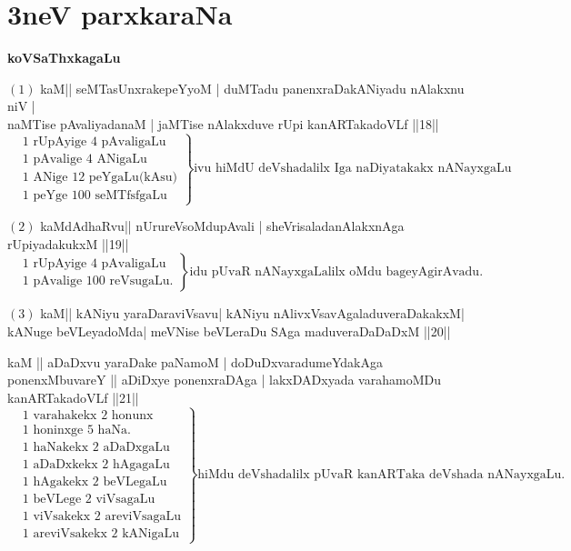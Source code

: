 \chapter{3neV parxkaraNa}

\centerline{{\huge\bf koVSaThxkagaLu}}
\smallskip

$(1)$ kaM|| seMTasUnxrakepeYyoM | duMTadu panenxraDakANiyadu nAlakxnu niV |\\
naMTise pAvaliyadanaM | jaMTise nAlakxduve rUpi kanARTakadoVLf ||18||
\begin{equation*}
\left.
\begin{aligned}
 &\text{$1$ rUpAyige $4$ pAvaligaLu}\\
 &\text{$1$ pAvalige $4$ ANigaLu}\\
 &\text{$1$ ANige $12$ peYgaLu(kAsu)}\\
 &\text{$1$ peYge $100$ seMTfsfgaLu}
\end{aligned}
\right\}
\text{ivu hiMdU deVshadalilx Iga 
naDiyatakakx nANayxgaLu}
\end{equation*}

$(2)$ kaMdAdhaRvu|| nUrureVsoMdupAvali | sheVrisaladanAlakxnAga rUpiyadakukxM ||19||
\begin{equation*}
\left.
\begin{aligned}
&\text{$1$ rUpAyige $4$ pAvaligaLu}\\
&\text{$1$ pAvalige $100$ reVsugaLu.}
\end{aligned}
\right\}
\text {idu pUvaR nANayxgaLalilx oMdu bageyAgirAvadu.}
\end{equation*}

$(3)$ kaM|| kANiyu yaraDaraviVsavu| kANiyu nAlivxVsavAgaladuveraDakakxM| kANuge beVLeyadoMda| meVNise beVLeraDu SAga maduveraDaDaDxM ||20||

kaM || aDaDxvu yaraDake paNamoM | doDuDxvaradumeYdakAga ponenxMbuvareY || aDiDxye ponenxraDAga | lakxDADxyada varahamoMDu kanARTakadoVLf ||21||
\begin{equation*}
\left.
\begin{aligned}
&\text{$1$ varahakekx $2$ honunx }\\
&\text{$1$ honinxge $5$ haNa.}\\
&\text{$1$ haNakekx  $2$ aDaDxgaLu}\\
&\text{$1$ aDaDxkekx $2$ hAgagaLu}\\
&\text{$1$ hAgakekx $2$ beVLegaLu}\\
&\text{$1$ beVLege $2$ viVsagaLu}\\
&\text{$1$ viVsakekx $2$ areviVsagaLu}\\
&\text{$1$ areviVsakekx $2$ kANigaLu}
\end{aligned}
\right\}
\text {hiMdu deVshadalilx pUvaR kanARTaka deVshada nANayxgaLu.}
\end{equation*}

